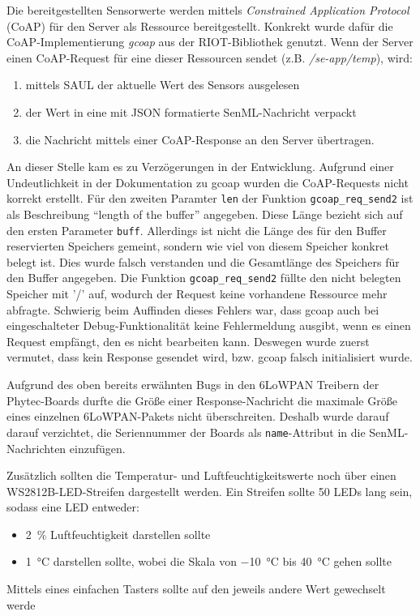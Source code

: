 \documentclass[a4paper]{article}
\begin{document}
Die bereitgestellten Sensorwerte werden mittels \emph{Constrained Application Protocol} (CoAP) für den Server als Ressource bereitgestellt. Konkrekt wurde dafür die CoAP-Implementierung \emph{gcoap} aus der RIOT-Bibliothek genutzt. Wenn der Server einen CoAP-Request für eine dieser Ressourcen sendet (z.B. \emph{/se-app/temp}), wird:
\begin{enumerate}
	\item mittels SAUL der aktuelle Wert des Sensors ausgelesen
    \item der Wert in eine mit JSON formatierte SenML-Nachricht verpackt
    \item die Nachricht mittels einer CoAP-Response an den Server übertragen.
\end{enumerate}
An dieser Stelle kam es zu Verzögerungen in der Entwicklung. Aufgrund einer Undeutlichkeit in der Dokumentation zu gcoap wurden die CoAP-Requests nicht korrekt erstellt. Für den zweiten Paramter \verb|len| der Funktion \verb|gcoap_req_send2| ist als Beschreibung \enquote{length of the buffer} angegeben. Diese Länge bezieht sich auf den ersten Parameter \verb|buff|. Allerdings ist nicht die Länge des für den Buffer reservierten Speichers gemeint, sondern wie viel von diesem Speicher konkret belegt ist. Dies wurde falsch verstanden und die Gesamtlänge des Speichers für den Buffer angegeben. Die Funktion \verb|gcoap_req_send2| füllte den nicht belegten Speicher mit '/' auf, wodurch der Request keine vorhandene Ressource mehr abfragte. Schwierig beim Auffinden dieses Fehlers war, dass gcoap auch bei eingeschalteter Debug-Funktionalität keine Fehlermeldung ausgibt, wenn es einen Request empfängt, den es nicht bearbeiten kann. Deswegen wurde zuerst vermutet, dass kein Response gesendet wird, bzw. gcoap falsch initialisiert wurde.

Aufgrund des oben bereits erwähnten Bugs in den 6LoWPAN Treibern der Phytec-Boards durfte die Größe einer Response-Nachricht die maximale Größe eines einzelnen 6LoWPAN-Pakets nicht überschreiten. Deshalb wurde darauf darauf verzichtet, die Seriennummer der Boards als \verb|name|-Attribut in die SenML-Nachrichten einzufügen.

Zusätzlich sollten die Temperatur- und Luftfeuchtigkeitswerte noch über einen WS2812B-LED-Streifen dargestellt werden. Ein Streifen sollte 50 LEDs lang sein, sodass eine LED entweder:
\begin{itemize}
	\item \SI{2}{\percent} Luftfeuchtigkeit darstellen sollte
    \item \SI{1}{\celsius} darstellen sollte, wobei die Skala von \SI{-10}{\celsius} bis \SI{40}{\celsius} gehen sollte
\end{itemize}
Mittels eines einfachen Tasters sollte auf den jeweils andere Wert gewechselt werde
\end{document}
